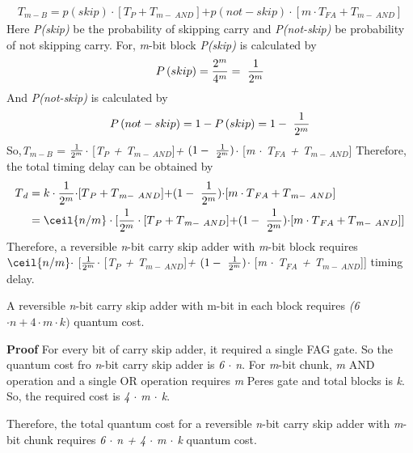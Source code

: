 \begin{align*}
{ T{}_{m-B} = p(skip) \cdot }[{ T{}_{P} +  T{}_{m-\ AND}}]{  + p(not-skip)\cdot }[{ m \cdot T{}_{FA} + T{}_{m-\ AND}}]
\end{align*}  	
\textnormal{
Here {\it P(skip)} be the probability of skipping carry and {\it P(not-skip)} be probability of not skipping carry.
For, {\it m}-bit block {\it P(skip)} is calculated by
$${P\left(skip\right)}={{2^m}\over {4^m}}=\ {{1}\over {2^m}}$$ 
And {\it P(not-skip)} is calculated by
$${P\left(not-skip\right)}={1-P\left(skip\right)}=1-\ {{1}\over {2^m}}$$ 
{\it }
So,{\it  T${}_{m-B}$} = ${{1}\over {2^m}}${\it  $\cdot$ }[{\it T${}_{P}$ +  T${}_{m-\ AND}$}]{\it  + }$(1-\ {{1}\over {2^m}})${\it $\cdot$ }[{\it m $\cdot$ T${}_{FA}$ + T${}_{m-\ AND}$}]
Therefore, the total timing delay can be obtained by
\begin{align*}
 T{}_{d} &= k \cdot {{1}\over {2^m}}{  \cdot }[{ T{}_{P} +  T{}_{m-\ AND}}]{  + }(1-\ {{1}\over {2^m}}){  \cdot }[{ m \cdot T{}_{FA} + T{}_{m-\ AND}}]\\
&=\ceil{n/m} \cdot [{{1}\over {2^m}}\cdot[{ T{}_{P} +  T{}_{m-\ AND}}]{  + }(1-\ {{1}\over {2^m}}){ \cdot }[{ m \cdot T{}_{FA} + T{}_{m-\ AND}}]]
\end{align*}}
\textnormal{
Therefore, a reversible {\it n}-bit carry skip adder with {\it m}-bit block requires $\ceil{n/m}\cdot$ [${{1}\over {2^m}}${\it  $\cdot$ }[{\it T${}_{P}$ +  T${}_{m-\ AND}$}]{\it  + }$(1-\ {{1}\over {2^m}})${\it $\cdot$ }[{\it m $\cdot$ T${}_{FA}$ + T${}_{m-\ AND}$}]] timing delay.}



\begin{property}\textnormal{
	 A reversible {\it n}-bit carry skip adder with m-bit in each block requires {\it (6 $\cdot n + 4 \cdot m \cdot k)$} quantum cost.}
\end{property}

\noindent\textbf{Proof}\textnormal{
	For every bit of carry skip adder, it required a single FAG gate. So the quantum cost fro {\it n}-bit carry skip adder is {\it 6 $\cdot$ n}. For {\it m}-bit chunk, {\it m} AND operation and a single OR operation requires {\it m }Peres gate and total blocks is {\it k}. So, the required cost is {\it 4 $\cdot$ m $\cdot$ k}.}

\textnormal{
	Therefore, the total quantum cost for a reversible {\it n}-bit carry skip adder with {\it m}-bit chunk requires {\it 6 $\cdot$ n + 4 $\cdot$ m $\cdot$ k} quantum cost.}


